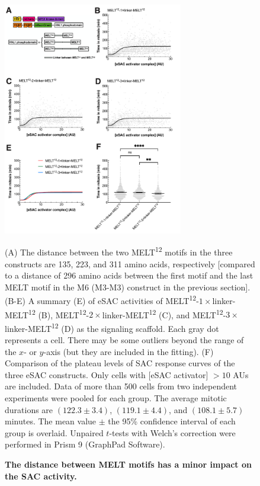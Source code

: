 \begin{figure}
    \centering
    \includegraphics[width=0.7\textwidth]{chapters/figures/DistanceEffect.pdf}
    \caption{\textbf{The distance between MELT motifs has a minor impact on the SAC activity.}}
    \noindent\justifying (A) The distance between the two MELT\textsuperscript{12} motifs in the three constructs are 135, 223, and 311 amino acids, respectively [compared to a distance of 296 amino acids between the first motif and the last MELT motif in the M6 (M3-M3) construct in the previous section]. (B-E) A summary (E) of eSAC activities of MELT\textsuperscript{12}-$1\times$linker-MELT\textsuperscript{12} (B), MELT\textsuperscript{12}-$2\times$linker-MELT\textsuperscript{12} (C), and MELT\textsuperscript{12}-$3\times$linker-MELT\textsuperscript{12} (D) as the signaling scaffold. Each gray dot represents a cell. There may be some outliers beyond the range of the $x$- or $y$-axis (but they are included in the fitting).  (F) Comparison of the plateau levels of SAC response curves of the three eSAC constructs. Only cells with [eSAC activator] $> 10$ AUs are included. Data of more than 500 cells from two independent experiments were pooled for each group. The average mitotic durations are $(122.3 \pm 3.4)$, $(119.1 \pm 4.4)$, and $(108.1 \pm 5.7)$ minutes. The mean value $\pm$ the 95\% confidence interval of each group is overlaid. Unpaired $t$-tests with Welch's correction were performed in Prism 9 (GraphPad Software).
    \label{DistanceEffect}
\end{figure}

